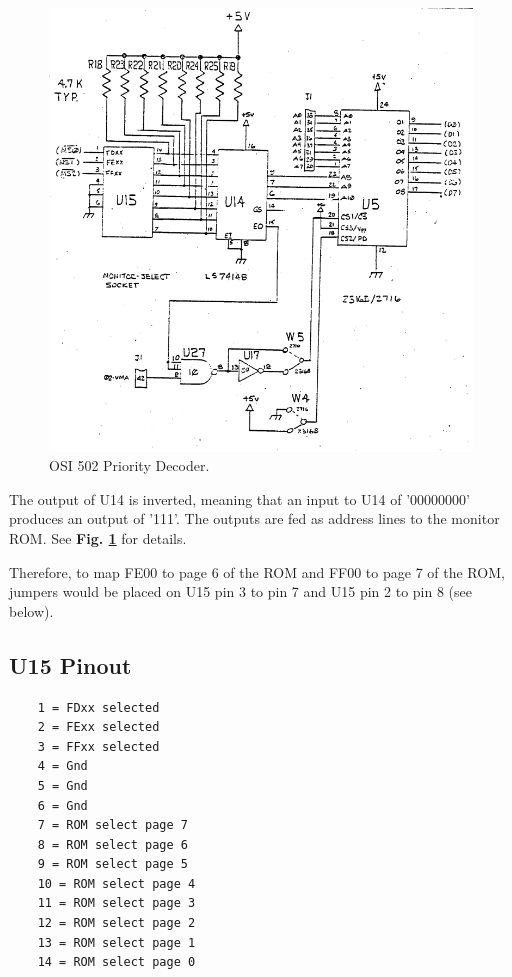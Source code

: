 \begin{figure}[htbp]
    \begin{center}
    \includegraphics[width=4.9in]{images/Decoder.png}
    \caption{OSI 502 Priority Decoder.}
    \label{fig:decoder}
    \end{center}
    \end{figure}

The output of U14 is inverted, meaning that an input to U14 of '00000000' produces an output of '111'. The outputs are fed as address lines to the monitor ROM. See \textbf{Fig. \ref{fig:decoder}} for details.

Therefore, to map FE00 to page 6 of the ROM and FF00 to page 7 of the ROM, jumpers would be placed on U15 pin 3 to pin 7 and U15 pin 2 to pin 8 (see below).

\subsection*{U15 Pinout}

\begin{verbatim}    
    1 = FDxx selected
    2 = FExx selected
    3 = FFxx selected
    4 = Gnd
    5 = Gnd
    6 = Gnd
    7 = ROM select page 7
    8 = ROM select page 6
    9 = ROM select page 5
    10 = ROM select page 4
    11 = ROM select page 3
    12 = ROM select page 2
    13 = ROM select page 1
    14 = ROM select page 0
\end{verbatim}

